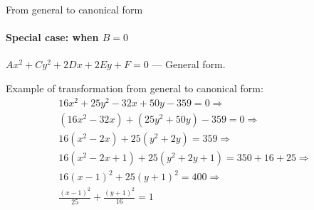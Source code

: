 \documentclass[aspectratio=169]{beamer}
\begin{document}
    \begin{frame}[t]{From general to canonical form}
        \framesubtitle{Special case: when $B=0$}
            $Ax^2 +Cy^2 +2Dx + 2Ey +F = 0$ --- General form. \medskip
        
            Example of transformation from general to canonical form:
            \begin{align*}
                16x^2 + 25y^2 - 32x + 50y -359 = 0 \Rightarrow \\
                (16x^2 - 32x) + (25y^2 +50y) -359 = 0 \Rightarrow \\ 
                16(x^2 - 2x) + 25(y^2 + 2y) = 359 \Rightarrow \\ 
                16(x^2 -2x +1) + 25(y^2 +2y +1) = 350 + 16 + 25 \Rightarrow \\
                16(x-1)^2 +25(y+1)^2 = 400 \Rightarrow \\ 
                \frac{(x-1)^2}{25}+\frac{(y+1)^2}{16}=1
            \end{align*}
        \end{frame}
\end{document}
